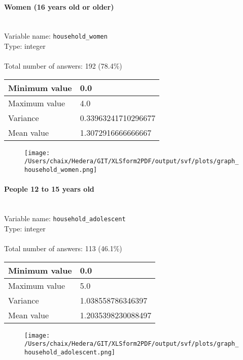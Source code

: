 \documentclass[11.5pt, a4paper]{scrartcl}
\begin{document}
\paragraph{Women (16 years old or older) }
\  \\Variable name: \texttt{household\_women}\\
Type: integer\\
\\Total number of answers: 192 (78.4\%)
\\[0.2em] \begin{tabular}{p{4cm}|p{8cm}}
Minimum value &0.0 \\
\hline
\cellcolor{mygray} Maximum value & \cellcolor{mygray}4.0 \\
\hline
Variance &0.33963241710296677 \\
\hline
\cellcolor{mygray} Mean value & \cellcolor{mygray}1.3072916666666667 \\
\hline
\end{tabular}
\begin{figure}[H]
\centering
\texttt{[image: /Users/chaix/Hedera/GIT/XLSform2PDF/output/svf/plots/graph\_household\_women.png]}
\end{figure}
\paragraph{People 12 to 15 years old }
\  \\Variable name: \texttt{household\_adolescent}\\
Type: integer\\
\\Total number of answers: 113 (46.1\%)
\\[0.2em] \begin{tabular}{p{4cm}|p{8cm}}
Minimum value &0.0 \\
\hline
\cellcolor{mygray} Maximum value & \cellcolor{mygray}5.0 \\
\hline
Variance &1.038558786346397 \\
\hline
\cellcolor{mygray} Mean value & \cellcolor{mygray}1.2035398230088497 \\
\hline
\end{tabular}
\begin{figure}[H]
\centering
\texttt{[image: /Users/chaix/Hedera/GIT/XLSform2PDF/output/svf/plots/graph\_household\_adolescent.png]}
\end{figure}
\end{document}
